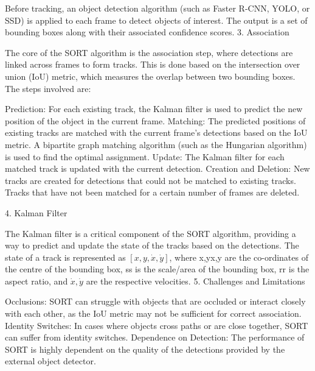 Before tracking, an object detection algorithm (such as Faster R-CNN, YOLO, or SSD) is applied to each frame to detect objects of interest. The output is a set of bounding boxes along with their associated confidence scores.
3. Association

The core of the SORT algorithm is the association step, where detections are linked across frames to form tracks. This is done based on the intersection over union (IoU) metric, which measures the overlap between two bounding boxes. The steps involved are:

Prediction: For each existing track, the Kalman filter is used to predict the new position of the object in the current frame.
Matching: The predicted positions of existing tracks are matched with the current frame's detections based on the IoU metric. A bipartite graph matching algorithm (such as the Hungarian algorithm) is used to find the optimal assignment.
Update: The Kalman filter for each matched track is updated with the current detection.
Creation and Deletion: New tracks are created for detections that could not be matched to existing tracks. Tracks that have not been matched for a certain number of frames are deleted.

4. Kalman Filter

The Kalman filter is a critical component of the SORT algorithm, providing a way to predict and update the state of the tracks based on the detections. The state of a track is represented as $[x,y,\dot{x},\dot{y}]$, where x,yx,y are the co-ordinates of the centre of the bounding box, ss is the scale/area of the bounding box, rr is the aspect ratio, and $\dot{x},\dot{y}$ are the respective velocities.
5. Challenges and Limitations

Occlusions: SORT can struggle with objects that are occluded or interact closely with each other, as the IoU metric may not be sufficient for correct association.
Identity Switches: In cases where objects cross paths or are close together, SORT can suffer from identity switches.
Dependence on Detection: The performance of SORT is highly dependent on the quality of the detections provided by the external object detector.




\FloatBarrier
